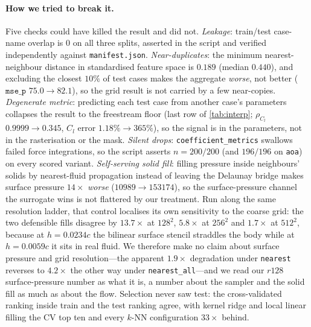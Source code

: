 \paragraph{How we tried to break it.} Five checks could have killed the result and did
not. \emph{Leakage}: train/test case-name overlap is $0$ on all three splits, asserted
in the script and verified independently against \texttt{manifest.json}.
\emph{Near-duplicates}: the minimum nearest-neighbour distance in standardised feature
space is $0.189$ (median $0.440$), and excluding the closest $10\%$ of test cases makes
the aggregate \emph{worse}, not better ($\texttt{mse\_p}$ $75.0\to82.1$), so the
grid result is not carried by a few near-copies. \emph{Degenerate metric}: predicting each
test case from another case's parameters collapses the result to the freestream floor
(last row of \autoref{tab:interp}; $\rho_{C_l}$ $0.9999\to0.345$, $C_l$ error
$1.18\%\to365\%$), so the signal is in the parameters, not in the rasterisation or the
mask. \emph{Silent drops}: \texttt{coefficient\_metrics} swallows failed force
integrations, so the script asserts $n=200/200$ (and $196/196$ on \texttt{aoa}) on
every scored variant. \emph{Self-serving solid fill}: filling pressure inside
neighbours' solids by nearest-fluid propagation instead of leaving the Delaunay bridge
makes surface pressure $14\times$ \emph{worse} ($10989\to153174$), so the
surface-pressure channel the surrogate wins is not flattered by our treatment. Run along the same resolution
ladder, that control localises its own sensitivity to the coarse grid: the two defensible
fills disagree by $13.7\times$ at $128^2$, $5.8\times$ at $256^2$ and $1.7\times$ at
$512^2$, because at $h=0.0234c$ the bilinear surface stencil straddles the body while at
$h=0.0059c$ it sits in real fluid. We therefore make no claim about surface pressure and
grid resolution---the apparent $1.9\times$ degradation under \texttt{nearest} reverses to
$4.2\times$ the other way under \texttt{nearest\_all}---and we read our $r128$
surface-pressure number as what it is, a number about the sampler and the solid fill as
much as about the flow. Selection never saw test: the
cross-validated ranking inside train and the test ranking agree, with kernel ridge and
local linear filling the CV top ten and every $k$-NN configuration $33\times$ behind.

